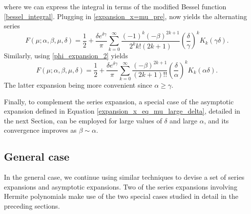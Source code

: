 \documentclass[10pt,a4paper,oneside]{article}
\numberwithin{equation}{section}
\begin{document}
where we can express the integral in terms of the modified Bessel function \eqref{bessel_integral}. Plugging in \eqref{expansion_x=mu_pre}, now yields the alternating series
\begin{equation}\label{series_x=mu_1}
F(\mu; \alpha, \beta, \mu, \delta) = \frac{1}{2} + \frac{\delta e^{\delta \gamma}}{\pi} \sum_{k=0}^{\infty} \frac{(-1)^k (-\beta)^{2k+1}}{2^k k! (2k + 1)} \left(\frac{\delta}{\gamma}\right)^k K_k(\gamma \delta).
\end{equation}
Similarly, using \eqref{phi_expansion_2} yields
\begin{equation}\label{series_x=mu_2}
F(\mu; \alpha, \beta, \mu, \delta) = \frac{1}{2} + \frac{\delta e^{\delta \gamma}}{\pi} \sum_{k=0}^{\infty} \frac{(-\beta)^{2k+1}}{(2k + 1)!!} \left(\frac{\delta}{\alpha}\right)^k K_k(\alpha \delta).
\end{equation}
The latter expansion being more convenient since $\alpha \ge \gamma$.

Finally, to complement the series expansion, a special case of the asymptotic expansion defined in Equation \eqref{expansion_x_eq_mu_large_delta}, detailed in the next Section, can be employed for large values of $\delta$ and large $\alpha$, and its convergence improves as $\beta \sim \alpha$.


\subsection{General case}\label{section_general_case}
In the general case, we continue using similar techniques to devise a set of series expansions and asymptotic expansions. Two of the series expansions involving Hermite polynomials make use of the two special cases studied in detail in the preceding sections.
\end{document}
